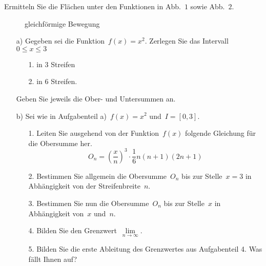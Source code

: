


Ermitteln Sie die Flächen unter den Funktionen in Abb.~$1$ sowie Abb.~$2$.
\begin{figure}[h!]
	\begin{center}
		\def\svgwidth{0.3\textwidth}
		
		\caption{gleichförmige Bewegung}
	\end{center}
\end{figure}

\begin{itemize}
\item[a)] Gegeben sei die Funktion~$f(x)=x^2$. Zerlegen Sie das Intervall~$0 \leq x \leq 3$
	\begin{itemize}
		\item[1.] in 3 Streifen
		\item[2.] in 6 Streifen.
	\end{itemize}
Geben Sie jeweils die Ober- und Untersummen an.
\item[b)] Sei wie in Aufgabenteil a)~$f(x)=x^2$ und~$I=\left[0,3\right]$.
	\begin{itemize}
		\item[1.] Leiten Sie ausgehend von der Funktion~$f(x)$ folgende Gleichung für die Obersumme her.
		\begin{equation*}
			O_n = \left(\frac{x}{n}\right)^3 \cdot \frac{1}{6} n \left(n + 1\right)\left(2n + 1\right)
		\end{equation*}
		\item[2.] Bestimmen Sie allgemein die Obersumme~$O_n$ bis zur Stelle~$x=3$ in Abhängigkeit von der Streifenbreite~$n$.
		\item[3.] Bestimmen Sie nun die Obersumme~$O_n$ bis zur Stelle~$x$ in Abhängigkeit von~$x$ und~$n$.
		\item[4.] Bilden Sie den Grenzwert~$\lim\limits_{n \to \infty}$.
		\item[5.] Bilden Sie die erste Ableitung des Grenzwertes aus Aufgabenteil 4. Was fällt Ihnen auf?
	\end{itemize}
\end{itemize}
